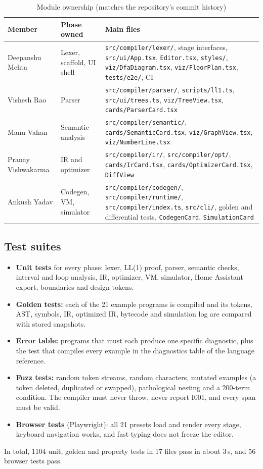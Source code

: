 \documentclass[conference]{IEEEtran}
\newcommand{\code}[1]{\texttt{#1}}
\begin{document}
\begin{table}[t]
\centering
\caption{Module ownership (matches the repository's commit history)}
\label{tab:contrib}
\footnotesize
\begin{tabular}{@{}l l >{\raggedright\arraybackslash}p{10.6cm}@{}}
\toprule
Member & Phase owned & Main files \\
\midrule
Deepanshu Mehta & Lexer, scaffold, UI shell & \code{src/compiler/lexer/}, stage interfaces, \code{src/ui/App.tsx}, \code{Editor.tsx}, \code{styles/}, \code{viz/DfaDiagram.tsx}, \code{viz/FloorPlan.tsx}, \code{tests/e2e/}, CI \\
Vishesh Rao & Parser & \code{src/compiler/parser/}, \code{scripts/ll1.ts}, \code{src/ui/trees.ts}, \code{viz/TreeView.tsx}, \code{cards/ParserCard.tsx} \\
Manu Vahan & Semantic analysis & \code{src/compiler/semantic/}, \code{cards/SemanticCard.tsx}, \code{viz/GraphView.tsx}, \code{viz/NumberLine.tsx} \\
Pranay Vishwakarma & IR and optimizer & \code{src/compiler/ir/}, \code{src/compiler/opt/}, \code{cards/IrCard.tsx}, \code{cards/OptimizerCard.tsx}, \code{DiffView} \\
Ankush Yadav & Codegen, VM, simulator & \code{src/compiler/codegen/}, \code{src/compiler/runtime/}, \code{src/compiler/index.ts}, \code{src/cli/}, golden and differential tests, \code{CodegenCard}, \code{SimulationCard} \\
\bottomrule
\end{tabular}
\end{table}

\subsection{Test suites}
\begin{itemize}
  \item \textbf{Unit tests} for every phase: lexer, LL(1) proof, parser, semantic checks, interval and loop analysis, IR, optimizer, VM, simulator, Home Assistant export, boundaries and design tokens.
  \item \textbf{Golden tests:} each of the 21 example programs is compiled and its tokens, AST, symbols, IR, optimized IR, bytecode and simulation log are compared with stored snapshots.
  \item \textbf{Error table:} programs that must each produce one specific diagnostic, plus the test that compiles every example in the diagnostics table of the language reference.
  \item \textbf{Fuzz tests:} random token streams, random characters, mutated examples (a token deleted, duplicated or swapped), pathological nesting and a 200-term condition. The compiler must never throw, never report I001, and every span must be valid.
  \item \textbf{Browser tests} (Playwright): all 21 presets load and render every stage, keyboard navigation works, and fast typing does not freeze the editor.
\end{itemize}
In total, 1104 unit, golden and property tests in 17 files pass in about 3\,s, and 56 browser tests pass.
\end{document}
